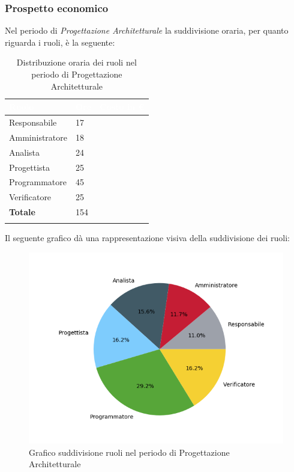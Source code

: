 \subsubsection{Prospetto economico}
Nel periodo di \textit{Progettazione Architetturale} la suddivisione oraria, per quanto riguarda i ruoli, è la seguente: 


\begin{longtable}{| C{.30\textwidth}| C{.15\textwidth}| C{.20\textwidth}|}
\hline
{}\textbf{\textcolor{white}{Ruolo}} & \textbf{\textcolor{white}{Ore}} & \textbf{\textcolor{white}{Costo in \euro}} \\
\hline 
Responsabile & 17 &  \\
\hline
{}Amministratore & 18 & \\
\hline
Analista & 24 &  \\
\hline
{}Progettista & 25 &  \\
\hline
Programmatore & 45 &  \\
\hline
{}Verificatore & 25 &  \\
\hline
\textbf{Totale} & 154 & \\ 
\hline

\caption{Distribuzione oraria dei ruoli nel periodo di Progettazione Architetturale}
\label{Distribuzione oraria del periodo di pa}
\end{longtable}

Il seguente grafico dà una rappresentazione visiva della suddivisione dei ruoli:
\begin{figure}[H]
	\centering
  		\includegraphics[width=1\linewidth]{./images/torta_pa.png}
  		\caption{Grafico suddivisione ruoli nel periodo di Progettazione Architetturale}
  		\label{fig:grafico suddivione ruoli pa}
\end{figure}


